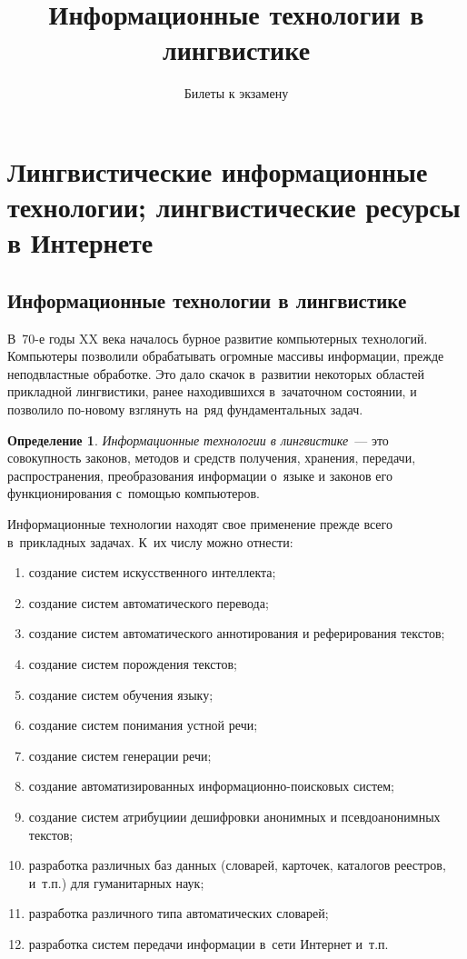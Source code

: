 \documentclass[12pt]{article}
\theoremstyle{definition}
\newtheorem*{defn}{Определение}
\theoremstyle{remark}
\numberwithin{equation}{section}
\begin{document}
\title{Информационные технологии в лингвистике}%
\author{Билеты к экзамену}%
\date{}
\maketitle
\tableofcontents

\section{Лингвистические информационные технологии; лингвистические ресурсы в Интернете}
\subsection{Информационные технологии в лингвистике}
В~70-е годы XX века началось бурное развитие компьютерных технологий.
Компьютеры позволили обрабатывать огромные массивы информации, прежде
неподвластные обработке. Это дало скачок в~развитии некоторых областей
прикладной лингвистики, ранее находившихся в~зачаточном состоянии, и
позволило по-новому взглянуть на~ряд фундаментальных задач.
\begin{defn}
    {\sl Информационные технологии в лингвистике}~--- это совокупность
    законов, методов и средств получения, хранения, передачи,
    распространения, преобразования информации о~языке и законов 
    его функционирования с~помощью компьютеров.
\end{defn}

Информационные технологии находят свое применение прежде всего
в~прикладных задачах. К~их числу можно отнести:
\begin{enumerate}
    \item создание систем искусственного интеллекта;
    \item создание систем автоматического перевода;
    \item создание систем автоматического аннотирования и реферирования
    текстов;
    \item создание систем порождения текстов;
    \item создание систем обучения языку;
    \item создание систем понимания устной речи;
    \item создание систем генерации речи;
    \item создание автоматизированных информационно-поисковых систем;
    \item создание систем атрибуциии дешифровки анонимных и
    псевдоанонимных текстов;
    \item разработка различных баз данных (словарей, карточек, каталогов
    реестров, и~т.п.) для гуманитарных наук;
    \item разработка различного типа автоматических словарей;
    \item разработка систем передачи информации в~сети Интернет и~т.п.
\end{enumerate}
\end{document}
